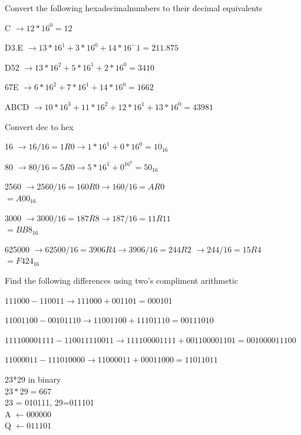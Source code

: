 \documentclass[12pt,largemargins]{homework}
\begin{document}
 Convert the following hexadecimalnumbers to their decimal equivalents\\
\begin{alphaparts}
\item
C $\rightarrow 12*16^0 = 12$
\item
D3.E $\rightarrow 13*16^1 + 3*16^0 +14*16^-1 = 211.875$
\item
D52 $\rightarrow 13*16^2 + 5*16^1 + 2*16^0=3410$
\item
67E $\rightarrow 6*16^2 + 7*16^1 + 14*16^0 = 1662$\\
\item
ABCD $\rightarrow 10*16^3 + 11*16^2 + 12*16^1 + 13*16^0 = 43981$
\end{alphaparts}
 Convert dec to hex
\begin{alphaparts}
\item
16 $\rightarrow 16/16 = 1 R 0\rightarrow1*16^1 + 0*16^0 = 10_{16}$
\item
80 $\rightarrow 80/16=5R0 \rightarrow5*16^1 + 0^16^0 = 50_{16}$
\item
2560 $\rightarrow 2560/16=160R0\rightarrow160/16=AR0$\\
$=A00_{16}$
\item
3000 $\rightarrow 3000/16=187R8\rightarrow187/16=11R11$\\
$=BB8_{16}$
\item
625000 $\rightarrow 62500/16=3906R4\rightarrow3906/16=244R2$
$\rightarrow244/16=15R4$\\
$=F424_{16}$
\end{alphaparts}
\newpage
{} Find the following differences using two's compliment arithmetic
\begin{alphaparts}
\item
$111000-110011 \rightarrow 111000+001101 = 000101$
\item
$11001100-00101110 \rightarrow 11001100+11101110=00111010$
\item
$111100001111-110011110011 \rightarrow 111100001111+001100001101=001000011100$
\item
$11000011-111010000 \rightarrow 11000011+00011000=11011011$
\end{alphaparts}
 23*29 in binary\\
$23 * 29 = 667$\\
23 = 010111, 29=011101\\
A $\leftarrow 000000$\\
Q $\leftarrow 011101$\\
\end{document}
